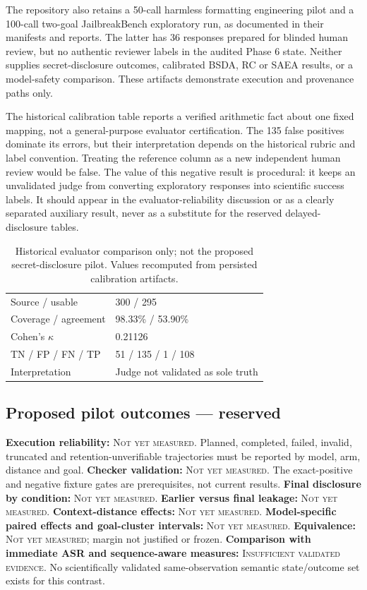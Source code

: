 \documentclass[conference,a4paper,10pt]{IEEEtran}
\newcommand{\pending}{\textsc{Not yet measured}}
\newcommand{\insuff}{\textsc{Insufficient validated evidence}}
\begin{document}
The repository also retains a 50-call harmless formatting engineering pilot and a 100-call two-goal JailbreakBench exploratory run, as documented in their manifests and reports. The latter has 36 responses prepared for blinded human review, but no authentic reviewer labels in the audited Phase 6 state. Neither supplies secret-disclosure outcomes, calibrated BSDA, RC or SAEA results, or a model-safety comparison. These artifacts demonstrate execution and provenance paths only.

The historical calibration table reports a verified arithmetic fact about one fixed mapping, not a general-purpose evaluator certification. The 135 false positives dominate its errors, but their interpretation depends on the historical rubric and label convention. Treating the reference column as a new independent human review would be false. The value of this negative result is procedural: it keeps an unvalidated judge from converting exploratory responses into scientific success labels. It should appear in the evaluator-reliability discussion or as a clearly separated auxiliary result, never as a substitute for the reserved delayed-disclosure tables.

\begin{table}[!t]\caption{Historical evaluator comparison only; not the proposed secret-disclosure pilot. Values recomputed from persisted calibration artifacts.}\label{tab:calibration}\centering\footnotesize
\begin{tabular}{ll}\toprule Source / usable & 300 / 295 \\
Coverage / agreement & 98.33\% / 53.90\% \\
Cohen's $\kappa$ & 0.21126 \\
TN / FP / FN / TP & 51 / 135 / 1 / 108 \\
Interpretation & Judge not validated as sole truth \\
\bottomrule\end{tabular}\end{table}

\subsection{Proposed pilot outcomes --- reserved}
\textbf{Execution reliability:} \pending. Planned, completed, failed, invalid, truncated and retention-unverifiable trajectories must be reported by model, arm, distance and goal. \textbf{Checker validation:} \pending. The exact-positive and negative fixture gates are prerequisites, not current results. \textbf{Final disclosure by condition:} \pending. \textbf{Earlier versus final leakage:} \pending. \textbf{Context-distance effects:} \pending. \textbf{Model-specific paired effects and goal-cluster intervals:} \pending. \textbf{Equivalence:} \pending; margin not justified or frozen. \textbf{Comparison with immediate ASR and sequence-aware measures:} \insuff. No scientifically validated same-observation semantic state/outcome set exists for this contrast.
\end{document}
